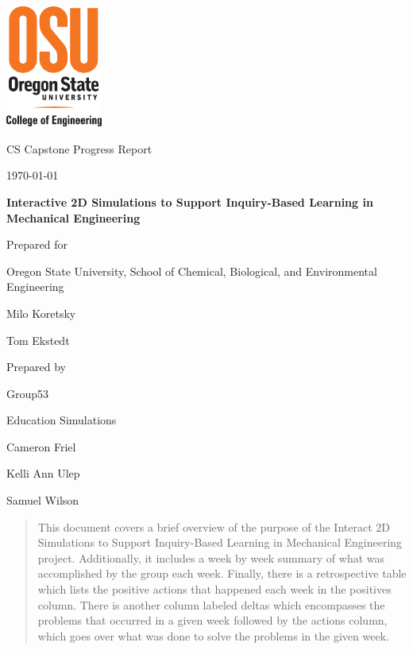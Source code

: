 \documentclass[onecolumn, draftclsnofoot,10pt, compsoc]{IEEEtran}
\def \CapstoneTeamName{Education Simulations}
\def \CapstoneTeamNumber{53}
\def \GroupMemberOne{Cameron Friel}
\def \GroupMemberTwo{Kelli Ann Ulep}
\def \GroupMemberThree{Samuel Wilson}
\def \CapstoneProjectName{Interactive 2D Simulations to Support Inquiry-Based Learning in Mechanical Engineering}
\def \CapstoneSponsorCompany{Oregon State University, School of Chemical, Biological, and Environmental Engineering}
\def \CapstoneSponsorPersonOne{Milo Koretsky}
\def \CapstoneSponsorPersonTwo{Tom Ekstedt}
\def \DocType{		%
				Progress Report
				}
\newcommand{\NameSigPair}[1]{\par
\makebox[2.75in][r]{#1} \hfil 	\makebox[3.25in]{\makebox[2.25in]{\hrulefill} \hfill		\makebox[.75in]{\hrulefill}}
\par\vspace{-12pt} \textit{\tiny\noindent
\makebox[2.75in]{} \hfil		\makebox[3.25in]{\makebox[2.25in][r]{Signature} \hfill	\makebox[.75in][r]{Date}}}}
\renewcommand{\NameSigPair}[1]{#1}
\begin{document}
\begin{titlepage}
    \begin{singlespace}
    	\includegraphics[height=4cm]{coe_v_spot1}
        \hfill 
        \par\vspace{.2in}
        \centering
        \scshape{
            \huge CS Capstone \DocType \par
            {\large\today}\par
            \vspace{.5in}
            \textbf{\Huge\CapstoneProjectName}\par
            \vfill
            {\large Prepared for}\par
            \Huge \CapstoneSponsorCompany\par
            \vspace{5pt}
            {\Large
                \NameSigPair{\CapstoneSponsorPersonOne}\par
                \NameSigPair{\CapstoneSponsorPersonTwo}\par
            }
            {\large Prepared by }\par
            Group\CapstoneTeamNumber\par
            \CapstoneTeamName\par 
            \vspace{5pt}
            {\Large
                \NameSigPair{\GroupMemberOne}\par
                \NameSigPair{\GroupMemberTwo}\par
                \NameSigPair{\GroupMemberThree}\par
            }
            \vspace{20pt}
        }
        \begin{abstract}
        This document covers a brief overview of the purpose of the Interact 2D Simulations to Support Inquiry-Based Learning in Mechanical Engineering project. Additionally, it includes a week by week summary of what was accomplished by the group each week. Finally, there is a retrospective table which lists the positive actions that happened each week in the positives column. There is another column labeled deltas which encompasses the problems that occurred in a given week followed by the actions column, which goes over what was done to solve the problems in the given week. 

        \end{abstract}     
    \end{singlespace}
\end{titlepage}
\end{document}
